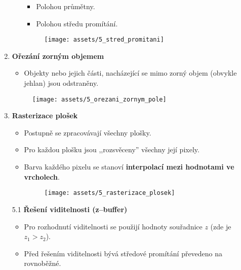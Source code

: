 \begin{enumerate}
\begin{itemize}
                    \begin{itemize}
                        \item Polohou průmětny.
                        \item Polohou středu promítání.
                    \end{itemize}
                    \begin{figure}[H]
                        \centering
                        \texttt{[image: assets/5\_stred\_promitani]}
                    \end{figure}
          \end{itemize}
    \item \textbf{Ořezání zorným objemem}
          \begin{itemize}
              \item Objekty nebo jejich části, nacházející se mimo zorný objem (obvykle jehlan) jsou odstraněny.
          \end{itemize}
          \begin{figure}[H]
              \centering
              \texttt{[image: assets/5\_orezani\_zornym\_pole]}
          \end{figure}
    \item \textbf{Rasterizace plošek}
          \begin{itemize}
              \item Postupně se zpracovávají všechny plošky.
              \item Pro každou plošku jsou ,,rozsvěceny'' všechny její pixely.
              \item Barva každého pixelu se stanoví \textbf{interpolací mezi hodnotami ve vrcholech}.
                    \begin{figure}[H]
                        \centering
                        \texttt{[image: assets/5\_rasterizace\_plosek]}
                    \end{figure}
          \end{itemize}
    \item[5.1] \textbf{Řešení viditelnosti (z--buffer)}
          \begin{itemize}
              \item Pro rozhodnutí viditelnosti se použijí hodnoty souřadnice $z$ (zde je $z_1 > z_2$).
              \item Před řešením viditelnosti bývá středové promítání převedeno na rovnoběžné.

\end{itemize}
\end{enumerate}
